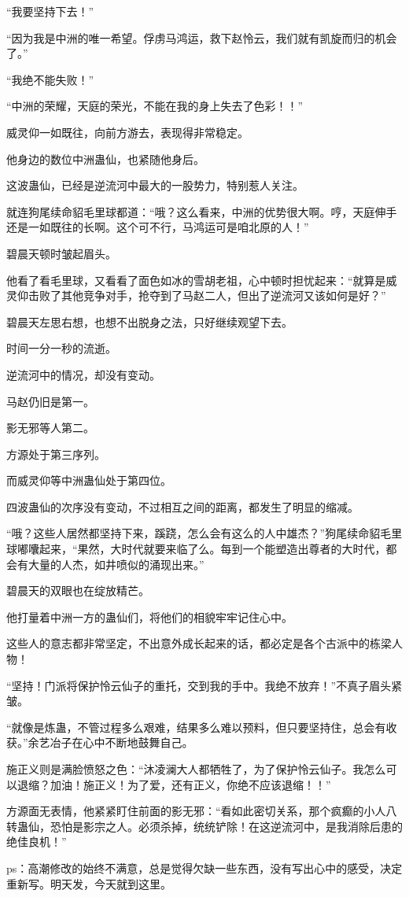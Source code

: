 \begin{this_body}
“我要坚持下去！”

“因为我是中洲的唯一希望。俘虏马鸿运，救下赵怜云，我们就有凯旋而归的机会了。”

“我绝不能失败！”

“中洲的荣耀，天庭的荣光，不能在我的身上失去了色彩！！”

威灵仰一如既往，向前方游去，表现得非常稳定。

他身边的数位中洲蛊仙，也紧随他身后。

这波蛊仙，已经是逆流河中最大的一股势力，特别惹人关注。

就连狗尾续命貂毛里球都道：“哦？这么看来，中洲的优势很大啊。哼，天庭伸手还是一如既往的长啊。这个可不行，马鸿运可是咱北原的人！”

碧晨天顿时皱起眉头。

他看了看毛里球，又看看了面色如冰的雪胡老祖，心中顿时担忧起来：“就算是威灵仰击败了其他竞争对手，抢夺到了马赵二人，但出了逆流河又该如何是好？”

碧晨天左思右想，也想不出脱身之法，只好继续观望下去。

时间一分一秒的流逝。

逆流河中的情况，却没有变动。

马赵仍旧是第一。

影无邪等人第二。

方源处于第三序列。

而威灵仰等中洲蛊仙处于第四位。

四波蛊仙的次序没有变动，不过相互之间的距离，都发生了明显的缩减。

“哦？这些人居然都坚持下来，蹊跷，怎么会有这么的人中雄杰？”狗尾续命貂毛里球嘟囔起来，“果然，大时代就要来临了么。每到一个能塑造出尊者的大时代，都会有大量的人杰，如井喷似的涌现出来。”

碧晨天的双眼也在绽放精芒。

他打量着中洲一方的蛊仙们，将他们的相貌牢牢记住心中。

这些人的意志都非常坚定，不出意外成长起来的话，都必定是各个古派中的栋梁人物！

“坚持！门派将保护怜云仙子的重托，交到我的手中。我绝不放弃！”不真子眉头紧皱。

“就像是炼蛊，不管过程多么艰难，结果多么难以预料，但只要坚持住，总会有收获。”余艺冶子在心中不断地鼓舞自己。

施正义则是满脸愤怒之色：“沐凌澜大人都牺牲了，为了保护怜云仙子。我怎么可以退缩？加油！施正义！为了爱，还有正义，你绝不应该退缩！！”

方源面无表情，他紧紧盯住前面的影无邪：“看如此密切关系，那个疯癫的小人八转蛊仙，恐怕是影宗之人。必须杀掉，统统铲除！在这逆流河中，是我消除后患的绝佳良机！”

ps：高潮修改的始终不满意，总是觉得欠缺一些东西，没有写出心中的感受，决定重新写。明天发，今天就到这里。

\end{this_body}

